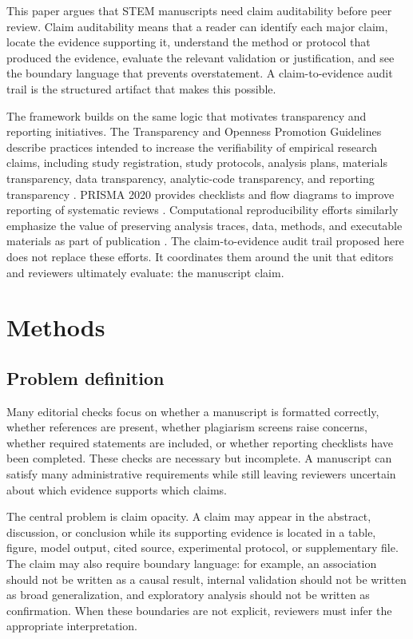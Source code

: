 \documentclass[12pt]{article}
\begin{document}
This paper argues that STEM manuscripts need claim auditability before peer review. Claim auditability means that a reader can identify each major claim, locate the evidence supporting it, understand the method or protocol that produced the evidence, evaluate the relevant validation or justification, and see the boundary language that prevents overstatement. A claim-to-evidence audit trail is the structured artifact that makes this possible.

The framework builds on the same logic that motivates transparency and reporting initiatives. The Transparency and Openness Promotion Guidelines describe practices intended to increase the verifiability of empirical research claims, including study registration, study protocols, analysis plans, materials transparency, data transparency, analytic-code transparency, and reporting transparency \parencite{cos_top_2025}. PRISMA 2020 provides checklists and flow diagrams to improve reporting of systematic reviews \parencite{prisma_2020}. Computational reproducibility efforts similarly emphasize the value of preserving analysis traces, data, methods, and executable materials as part of publication \parencite{meijer_2024_prat}. The claim-to-evidence audit trail proposed here does not replace these efforts. It coordinates them around the unit that editors and reviewers ultimately evaluate: the manuscript claim.

\section{Methods}

\subsection{Problem definition}

Many editorial checks focus on whether a manuscript is formatted correctly, whether references are present, whether plagiarism screens raise concerns, whether required statements are included, or whether reporting checklists have been completed. These checks are necessary but incomplete. A manuscript can satisfy many administrative requirements while still leaving reviewers uncertain about which evidence supports which claims.

The central problem is claim opacity. A claim may appear in the abstract, discussion, or conclusion while its supporting evidence is located in a table, figure, model output, cited source, experimental protocol, or supplementary file. The claim may also require boundary language: for example, an association should not be written as a causal result, internal validation should not be written as broad generalization, and exploratory analysis should not be written as confirmation. When these boundaries are not explicit, reviewers must infer the appropriate interpretation.
\end{document}
